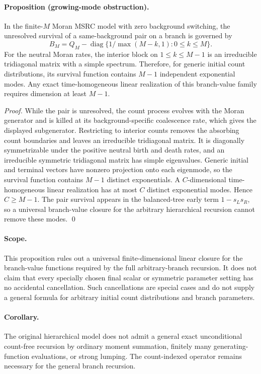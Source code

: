 \paragraph{Proposition (growing-mode obstruction).}
In the finite-\(M\) Moran MSRC model with zero background switching, the
unresolved survival of a same-background pair on a branch is governed by
\[
B_M=Q_M-\operatorname{diag}\{1/\max(M-k,1):0\le k\le M\}.
\]
For the neutral Moran rates, the interior block on
\(1\le k\le M-1\) is an irreducible tridiagonal matrix with a simple
spectrum. Therefore, for generic initial count distributions, its survival
function contains \(M-1\) independent exponential modes. Any exact
time-homogeneous linear realization of this branch-value family requires
dimension at least \(M-1\).

\emph{Proof.} While the pair is unresolved, the count process evolves with
the Moran generator and is killed at its background-specific coalescence rate,
which gives the displayed subgenerator. Restricting to interior counts removes
the absorbing count boundaries and leaves an irreducible tridiagonal matrix.
It is diagonally symmetrizable under the positive neutral birth and death
rates, and an irreducible symmetric tridiagonal matrix has simple eigenvalues.
Generic initial and terminal vectors have nonzero projection onto each
eigenmode, so the survival function contains \(M-1\) distinct exponentials.
A \(C\)-dimensional time-homogeneous linear realization has at most \(C\)
distinct exponential modes. Hence \(C\ge M-1\). The pair survival appears in
the balanced-tree early term \(1-s_Ls_R\), so a universal branch-value closure
for the arbitrary hierarchical recursion cannot remove these modes. \qed

\paragraph{Scope.}
This proposition rules out a universal finite-dimensional linear closure for
the branch-value functions required by the full arbitrary-branch recursion.
It does not claim that every specially chosen final scalar or symmetric
parameter setting has no accidental cancellation. Such cancellations are
special cases and do not supply a general formula for arbitrary initial count
distributions and branch parameters.

\paragraph{Corollary.}
The original hierarchical model does not admit a general exact unconditional
count-free recursion by ordinary moment summation, finitely many
generating-function evaluations, or strong lumping. The count-indexed operator
remains necessary for the general branch recursion.

